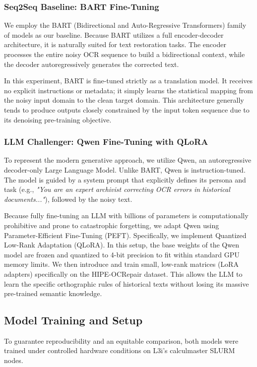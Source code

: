 \documentclass[11pt]{extarticle}
\begin{document}
\subsubsection{Seq2Seq Baseline: BART Fine-Tuning}
We employ the BART (Bidirectional and Auto-Regressive Transformers) family of models as our baseline. Because BART utilizes a full encoder-decoder architecture, it is naturally suited for text restoration tasks. The encoder processes the entire noisy OCR sequence to build a bidirectional context, while the decoder autoregressively generates the corrected text. 

In this experiment, BART is fine-tuned strictly as a translation model. It receives no explicit instructions or metadata; it simply learns the statistical mapping from the noisy input domain to the clean target domain. This architecture generally tends to produce outputs closely constrained by the input token sequence due to its denoising pre-training objective.

\subsubsection{LLM Challenger: Qwen Fine-Tuning with QLoRA}
To represent the modern generative approach, we utilize Qwen, an autoregressive decoder-only Large Language Model. Unlike BART, Qwen is instruction-tuned. The model is guided by a system prompt that explicitly defines its persona and task (e.g., \textit{"You are an expert archivist correcting OCR errors in historical documents..."}), followed by the noisy text.

Because fully fine-tuning an LLM with billions of parameters is computationally prohibitive and prone to catastrophic forgetting, we adapt Qwen using Parameter-Efficient Fine-Tuning (PEFT). Specifically, we implement Quantized Low-Rank Adaptation (QLoRA). In this setup, the base weights of the Qwen model are frozen and quantized to 4-bit precision to fit within standard GPU memory limits. We then introduce and train small, low-rank matrices (LoRA adapters) specifically on the HIPE-OCRepair dataset. This allows the LLM to learn the specific orthographic rules of historical texts without losing its massive pre-trained semantic knowledge.

\subsection{Model Training and Setup}
To guarantee reproducibility and an equitable comparison, both models were trained under controlled hardware conditions on L3i’s calculmaster SLURM nodes.
\end{document}
